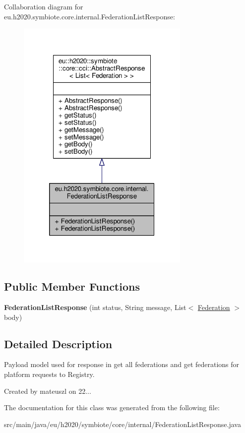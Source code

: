 Collaboration diagram for eu.\+h2020.\+symbiote.\+core.\+internal.\+Federation\+List\+Response\+:
\nopagebreak
\begin{figure}[H]
\begin{center}
\leavevmode
\includegraphics[width=236pt]{classeu_1_1h2020_1_1symbiote_1_1core_1_1internal_1_1FederationListResponse__coll__graph}
\end{center}
\end{figure}
\subsection*{Public Member Functions}
\begin{DoxyCompactItemize}
\item 
\mbox{\label{classeu_1_1h2020_1_1symbiote_1_1core_1_1internal_1_1FederationListResponse_aea0813a485ee25a6fdba57ede896dcb9}} 
{\bfseries Federation\+List\+Response} (int status, String message, List$<$ \hyperlink{classeu_1_1h2020_1_1symbiote_1_1model_1_1mim_1_1Federation}{Federation} $>$ body)
\end{DoxyCompactItemize}


\subsection{Detailed Description}
Payload model used for response in \textquotesingle{}get all federations\textquotesingle{} and \textquotesingle{}get federations for platform\textquotesingle{} requests to Registry.

Created by mateuszl on 22... 

The documentation for this class was generated from the following file\+:\begin{DoxyCompactItemize}
\item 
src/main/java/eu/h2020/symbiote/core/internal/Federation\+List\+Response.\+java\end{DoxyCompactItemize}

